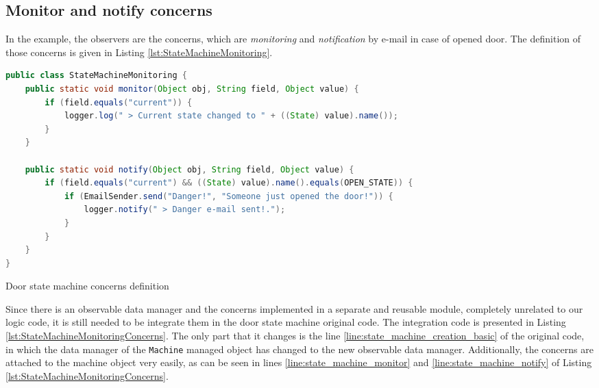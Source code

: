 \subsection{Monitor and notify concerns}
In the example, the observers are the concerns, which are \textit{monitoring} and \textit{notification} by e-mail in case of opened door. 
The definition of those concerns is given in Listing \ref{lst:StateMachineMonitoring}.

\begin{sourcecode} [H]
	\begin{lstlisting}[language=Java, escapechar=|]
public class StateMachineMonitoring {
    public static void monitor(Object obj, String field, Object value) {
        if (field.equals("current")) {
            logger.log(" > Current state changed to " + ((State) value).name());
        }
    }

    public static void notify(Object obj, String field, Object value) {
        if (field.equals("current") && ((State) value).name().equals(OPEN_STATE)) {
            if (EmailSender.send("Danger!", "Someone just opened the door!")) {
            	logger.notify(" > Danger e-mail sent!.");
            }
        }
    }
}
	\end{lstlisting}
	\caption{Door state machine concerns definition}
	\label{lst:StateMachineMonitoring}
\end{sourcecode}

Since there is an observable data manager and the concerns implemented in a separate and reusable module, completely unrelated to our logic code, it is still needed to be integrate them in the door state machine original code.
The integration code is presented in Listing \ref{lst:StateMachineMonitoringConcerns}.
The only part that it changes is the line \ref{line:state_machine_creation_basic} of the original code, in which the data manager of the \texttt{Machine} managed object has changed to the new observable data manager.
Additionally, the concerns are attached to the machine object very easily, as can be seen in lines \ref{line:state_machine_monitor} and \ref{line:state_machine_notify} of Listing \ref{lst:StateMachineMonitoringConcerns}.


